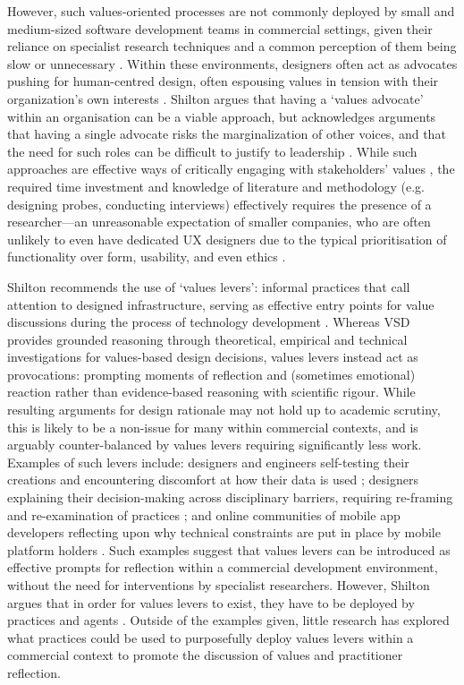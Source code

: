 However, such values-oriented processes are not commonly deployed by small and medium-sized software development teams in commercial settings, given their reliance on specialist research techniques and a common perception of them being slow or unnecessary \cite{Shilton2013}. Within these environments, designers often act as advocates pushing for human-centred design, often espousing values in tension with their organization's own interests \cite{Chivukula2020}. Shilton argues that having a `values advocate' within an organisation can be a viable approach, but acknowledges arguments that having a single advocate risks the marginalization of other voices, and that the need for such roles can be difficult to justify to leadership \cite{shilton2018, manders2013, Borning2012}. While such approaches are effective ways of critically engaging with stakeholders' values \cite{DeVito2021}, the required time investment and knowledge of literature and methodology (e.g. designing probes, conducting interviews) effectively requires the presence of a researcher---an unreasonable expectation of smaller companies, who are often unlikely to even have dedicated UX designers due to the typical prioritisation of functionality over form, usability, and even ethics \cite{Ardito2014, Shilton2013}.

Shilton recommends the use of `values levers': informal practices that call attention to designed infrastructure, serving as effective entry points for value discussions during the process of technology development \cite{Shilton2013, shilton2018}. Whereas VSD provides grounded reasoning through theoretical, empirical and technical investigations for values-based design decisions, values levers instead act as provocations: prompting moments of reflection and (sometimes emotional) reaction rather than evidence-based reasoning with scientific rigour. While resulting arguments for design rationale may not hold up to academic scrutiny, this is likely to be a non-issue for many within commercial contexts, and is arguably counter-balanced by values levers requiring significantly less work. Examples of such levers include: designers and engineers self-testing their creations and encountering discomfort at how their data is used \cite{Shilton2013}; designers explaining their decision-making across disciplinary barriers, requiring re-framing and re-examination of practices \cite{shilton2018}; and online communities of mobile app developers reflecting upon why technical constraints are put in place by mobile platform holders \cite{shilton2019}. Such examples suggest that values levers can be introduced as effective prompts for reflection within a commercial development environment, without the need for interventions by specialist researchers. However, Shilton argues that in order for values levers to exist, they have to be deployed by practices and agents \cite{Shilton2013}. Outside of the examples given, little research has explored what practices could be used to purposefully deploy values levers within a commercial context to promote the discussion of values and practitioner reflection.

